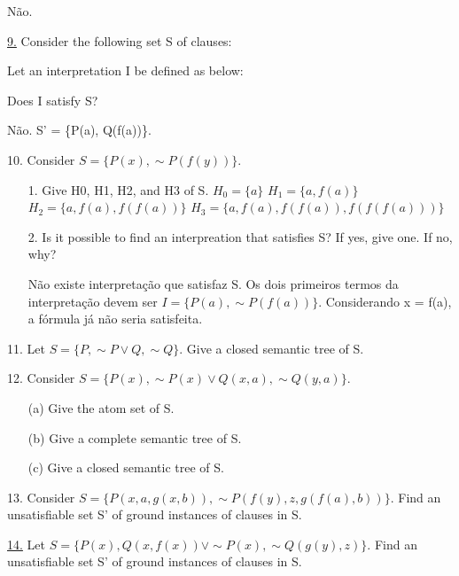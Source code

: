 Não.

\underline{9.} Consider the following set S of clauses:


Let an interpretation I be defined as below:


Does I satisfy S?

Não. S' = \{P(a), Q(f(a))\}.

10. Consider $ S = \{P(x), \sim P(f(y))\} $.

\begin{itemize}
 \item[1.] Give H0, H1, H2, and H3 of S. \newline
$ H_0 = \{a\} $ \newline
$ H_1 = \{a, f(a)\} $ \newline
$ H_2 = \{a, f(a), f(f(a))\} $ \newline
$ H_3 = \{a, f(a), f(f(a)), f(f(f(a)))\} $
 \item[2.] Is it possible to find an interpreation that satisfies S? If yes, give one. If no, why?

Não existe interpretação que satisfaz S. Os dois primeiros termos da interpretação devem ser $I = \{ P(a), \sim P(f(a)) \}$. Considerando x = f(a), a fórmula já não seria satisfeita.
\end{itemize}

11. Let $ S = \{P, \sim P \vee Q, \sim Q\} $. Give a closed semantic tree of S.

12. Consider $ S = \{P(x), \sim P(x) \vee Q(x,a), \sim Q(y,a)\} $.
\begin{itemize}
 \item[(a)] Give the atom set of S.
 \item[(b)] Give a complete semantic tree of S.
 \item[(c)] Give a closed semantic tree of S.
\end{itemize}

13. Consider $ S = \{P(x,a,g(x,b)), \sim P(f(y),z,g(f(a),b))\} $. Find an unsatisfiable set S' of ground instances of clauses in S.



\underline{14.} Let $ S = \{P(x),Q(x,f(x)) \vee \sim P(x), \sim Q(g(y),z)\} $. Find an unsatisfiable set S' of ground instances of clauses in S.

